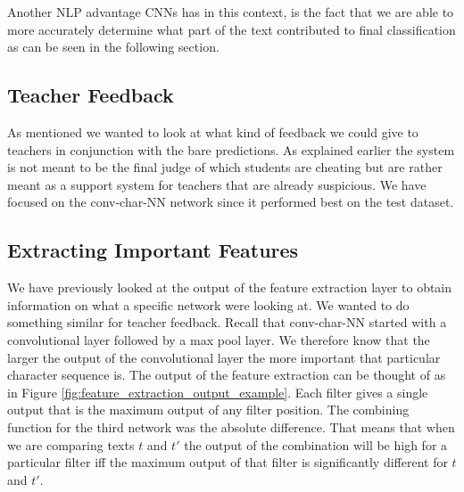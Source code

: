 Another \gls{NLP} advantage \gls{CNN}s has in this context, is the fact that
we are able to more accurately determine what part of the text contributed to
final classification as can be seen in the following section.


\subsection{Teacher Feedback}

As mentioned we wanted to look at what kind of feedback we could give to
teachers in conjunction with the bare predictions. As explained earlier the
system is not meant to be the final judge of which students are cheating
but are rather meant as a support system for teachers that are already
suspicious. We have focused on the \gls{conv-char-NN} network since it performed
best on the test dataset. 

\subsection{Extracting Important Features}

We have previously looked at the output of the feature extraction layer to
obtain information on what a specific network were looking at. We wanted to do
something similar for teacher feedback. Recall that \gls{conv-char-NN} started
with a convolutional layer followed by a max pool layer. We therefore know
that the larger the output of the convolutional layer the more important that
particular character sequence is. The output of the feature extraction can be
thought of as in Figure \ref{fig:feature_extraction_output_example}. Each filter
gives a single output that is the maximum output of any filter position. The
combining function for the third network was the absolute difference. That means
that when we are comparing texts $t$ and $t'$ the output of the combination
will be high for a particular filter iff the maximum output of that filter is
significantly different for $t$ and $t'$.

